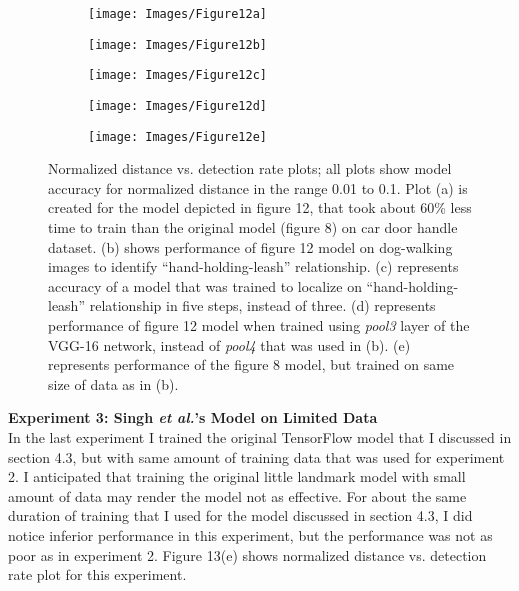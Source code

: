 \documentclass [11pt,letterpaper ,openany ]{report}
\begin{document}
    \begin{figure}[h!]
    \centering
        \begin{subfigure}[b]{.45\linewidth}
            \texttt{[image: Images/Figure12a]}
            \caption{}
        \end{subfigure}

        \begin{subfigure}[b]{.45\linewidth}
            \texttt{[image: Images/Figure12b]}
            \caption{}
        \end{subfigure}
        \begin{subfigure}[b]{.45\linewidth}
            \texttt{[image: Images/Figure12c]}
            \caption{}
        \end{subfigure}        

        \begin{subfigure}[b]{.45\linewidth}
            \texttt{[image: Images/Figure12d]}
            \caption{}
        \end{subfigure}
        \begin{subfigure}[b]{.45\linewidth}
            \texttt{[image: Images/Figure12e]}
            \caption{}
        \end{subfigure}                
        \caption{Normalized distance vs. detection rate plots; all plots show model accuracy for normalized distance in the range 0.01 to 0.1. Plot (a) is created for the model depicted in figure 12, that took about 60\% less time to train than the original model (figure 8) on car door handle dataset. (b) shows performance of figure 12 model on dog-walking images to identify ``hand-holding-leash'' relationship. (c) represents accuracy of a model that was trained to localize on ``hand-holding-leash'' relationship in five steps, instead of three. (d) represents performance of figure 12 model when trained using \textit{pool3} layer of the VGG-16 network, instead of \textit{pool4} that was used in (b). (e) represents performance of the figure 8 model, but trained on same size of data as in (b).}
    \end{figure}   

    \noindent
    \textbf{Experiment 3: Singh \textit{et al.}'s Model on Limited Data}\\             
    In the last experiment I trained the original TensorFlow model that I discussed in section 4.3, but with same amount of training data that was used for experiment 2. I anticipated that training the original little landmark model with small amount of data may render the model not as effective. For about the same duration of training that I used for the model discussed in section 4.3, I did notice inferior performance in this experiment, but the performance was not as poor as in experiment 2. Figure 13(e) shows normalized distance vs. detection rate plot for this experiment. 
\end{document}
